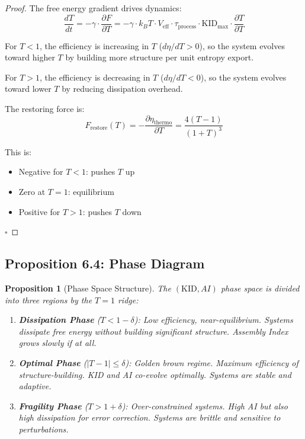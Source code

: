 \documentclass[11pt,a4paper]{article}
\newtheorem{proposition}[theorem]{Proposition}
\begin{document}
\begin{proof}
The free energy gradient drives dynamics:
\begin{equation}
\frac{dT}{dt} = -\gamma \cdot \frac{\partial F}{\partial T} = -\gamma \cdot k_B T \cdot V_{\text{eff}} \cdot \tau_{\text{process}} \cdot \text{KID}_{\max} \cdot \frac{\partial T}{\partial T}
\end{equation}

For $T < 1$, the efficiency is increasing in $T$ ($d\eta/dT > 0$), so the system evolves toward higher $T$ by building more structure per unit entropy export.

For $T > 1$, the efficiency is decreasing in $T$ ($d\eta/dT < 0$), so the system evolves toward lower $T$ by reducing dissipation overhead.

The restoring force is:
\begin{equation}
F_{\text{restore}}(T) = -\frac{\partial \eta_{\text{thermo}}}{\partial T} = \frac{4(T-1)}{(1+T)^3}
\end{equation}

This is:
\begin{itemize}
\item Negative for $T < 1$: pushes $T$ up
\item Zero at $T = 1$: equilibrium
\item Positive for $T > 1$: pushes $T$ down
\end{itemize}
\hfill $\square$
\end{proof}

\subsection{Proposition 6.4: Phase Diagram}

\begin{proposition}[Phase Space Structure]
The $(\text{KID}, AI)$ phase space is divided into three regions by the $T = 1$ ridge:
\begin{enumerate}[label=\textbf{\arabic*.}]
\item \textbf{Dissipation Phase} ($T < 1 - \delta$): Low efficiency, near-equilibrium. Systems dissipate free energy without building significant structure. Assembly Index grows slowly if at all.

\item \textbf{Optimal Phase} ($|T - 1| \leq \delta$): Golden brown regime. Maximum efficiency of structure-building. KID and AI co-evolve optimally. Systems are stable and adaptive.

\item \textbf{Fragility Phase} ($T > 1 + \delta$): Over-constrained systems. High AI but also high dissipation for error correction. Systems are brittle and sensitive to perturbations.
\end{enumerate}
\end{proposition}
\end{document}
